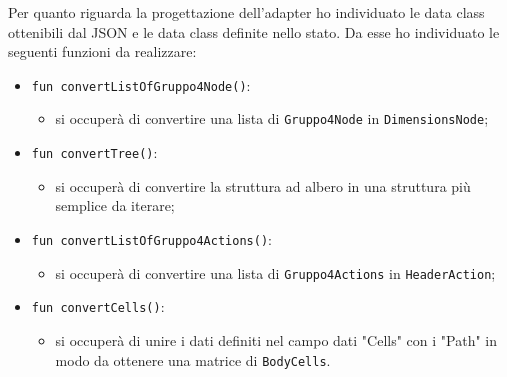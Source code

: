 Per quanto riguarda la progettazione dell'adapter ho individuato le data class ottenibili dal JSON e le data class definite nello stato. Da esse ho individuato le seguenti funzioni da realizzare:
\begin{itemize}
	\item \verb|fun convertListOfGruppo4Node()|:
	\begin{itemize}
		\item si occuperà di convertire una lista di \verb|Gruppo4Node| in \verb|DimensionsNode|;
	\end{itemize}

	\item \verb|fun convertTree()|:
	\begin{itemize}
		\item si occuperà di convertire la struttura ad albero in una struttura più semplice da iterare;
	\end{itemize}
	
	\item \verb|fun convertListOfGruppo4Actions()|:
	\begin{itemize}
		\item si occuperà di convertire una lista di \verb|Gruppo4Actions| in \verb|HeaderAction|;
	\end{itemize}

	\item \verb|fun convertCells()|:
	\begin{itemize}
		\item si occuperà di unire i dati definiti nel campo dati "Cells" con i "Path" in modo da ottenere una matrice di \verb|BodyCells|.
	\end{itemize}
\end{itemize}

